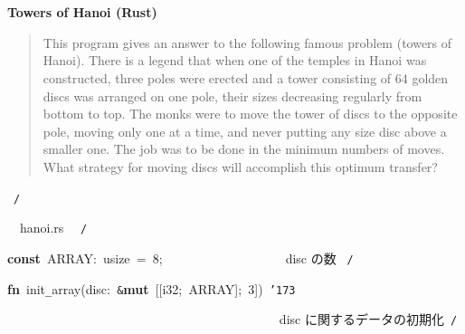 \documentclass[a4paper,10pt]{article}
\def\mc{\relax}
\begin{document}
\tt\mc 

\noindent
\mbox{}\rm\mc {\tt /}{\tt *}\  \hrulefill *
\tt\mc 

\noindent
\mbox{}\hfill

\noindent
\mbox{}\rm\mc \ %

\centerline{\bf Towers of Hanoi (Rust)}

\begin{quote}

This program gives an answer to the following famous problem (towers of
Hanoi).
There is a legend that when one of the temples in Hanoi was constructed,
three poles were erected and a tower consisting of 64 golden discs was
arranged on one pole, their sizes decreasing regularly from bottom to top.
The monks were to move the tower of discs to the opposite pole, moving
only one at a time, and never putting any size disc above a smaller one.
The job was to be done in the minimum numbers of moves. What strategy for
moving discs will accomplish this optimum transfer?
\end{quote}

\tt\mc 

\noindent
\mbox{}\hfill

\noindent
\mbox{}\rm\mc {\tt *} \hrulefill \rm\mc \ {\tt *}{\tt /}
\tt\mc 

\noindent
\mbox{}\hfill

\noindent
\mbox{}\rm\mc {\tt /}{\tt *}\  \hrulefill\ hanoi.rs \ \hrulefill \rm\mc \ {\tt *}{\tt /}
\tt\mc 

\noindent
\mbox{}\hfill

\noindent
\mbox{}\textbf{const}{\tt\mc \ }ARRAY:{\tt\mc \ }usize{\tt\mc \ }={\tt\mc \ }8;{\tt\mc \ }{\tt\mc \ }{\tt\mc \ }{\tt\mc \ }{\tt\mc \ }{\tt\mc \ }{\tt\mc \ }{\tt\mc \ }{\tt\mc \ }{\tt\mc \ }{\tt\mc \ }{\tt\mc \ }{\tt\mc \ }{\tt\mc \ }{\tt\mc \ }{\tt\mc \ }{\tt\mc \ }\rm\mc {\tt /}{\tt *}\  \ disc の数 \hfill \rm\mc \ {\tt *}{\tt /}
\tt\mc 

\noindent
\mbox{}\hfill

\noindent
\mbox{}\textbf{fn}{\tt\mc \ }init{\tt\_}array(disc:{\tt\mc \ }{\tt\&}\textbf{mut}{\tt\mc \ }[[i32;{\tt\mc \ }ARRAY];{\tt\mc \ }3]){\tt\mc \ }{\tt\char'173}

\noindent
\mbox{}{\tt\mc \ }{\tt\mc \ }{\tt\mc \ }{\tt\mc \ }{\tt\mc \ }{\tt\mc \ }{\tt\mc \ }{\tt\mc \ }{\tt\mc \ }{\tt\mc \ }{\tt\mc \ }{\tt\mc \ }{\tt\mc \ }{\tt\mc \ }{\tt\mc \ }{\tt\mc \ }{\tt\mc \ }{\tt\mc \ }{\tt\mc \ }{\tt\mc \ }{\tt\mc \ }{\tt\mc \ }{\tt\mc \ }{\tt\mc \ }{\tt\mc \ }{\tt\mc \ }{\tt\mc \ }{\tt\mc \ }{\tt\mc \ }{\tt\mc \ }{\tt\mc \ }{\tt\mc \ }{\tt\mc \ }{\tt\mc \ }{\tt\mc \ }{\tt\mc \ }{\tt\mc \ }{\tt\mc \ }{\tt\mc \ }{\tt\mc \ }\rm\mc {\tt /}{\tt *}\  \ disc に関するデータの初期化\hfill \rm\mc \ {\tt *}{\tt /}
\tt\mc 
\end{document}
